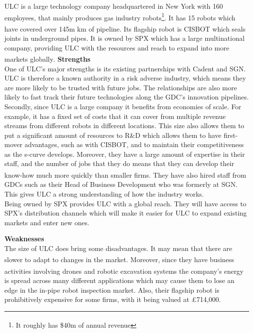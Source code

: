 \documentclass[11pt]{article}		%
\newcommand{\supercite}[1]{\textsuperscript{\cite{#1}}}		%
\begin{document}
     	ULC is a large technology company headquartered in New York with 160 employees, that mainly produces gas industry robots\footnote{It roughly has \$40m of annual revenue\supercite{SPX_acquisition}}. It has 15 robots which have covered over 145m km of pipeline\supercite{ULC_news}. Its flagship robot is CISBOT which seals joints in underground pipes. It is owned by SPX which has a large multinational company, providing ULC with the resources and reach to expand into more markets globally\supercite{SPX_acquisition}. %
     	    \pagebreak
	        \textbf{Strengths}
	        \\
	        One of ULC's major strengths is its existing partnerships with Cadent and SGN. ULC is therefore a known authority in a risk adverse industry, which means they are more likely to be trusted with future jobs. The relationships are also more likely to fast track their future technologies along the GDC's innovation pipelines. 
	        \\
            \hspace*{2ex}Secondly, since ULC is a large company it benefits from economies of scale. For example, it has a fixed set of costs that it can cover from multiple revenue streams from different robots in different locations. This size also allows them to put a significant amount of resources to R\&D which allows them to have first-mover advantages, such as with CISBOT, and to maintain their competitiveness as the s-curve develops. Moreover, they have a large amount of expertise in their staff, and the number of jobs that they do means that they can develop their know-how much more quickly than smaller firms\supercite{Barney}.
	        They have also hired staff from GDCs  such as their Head of Business Development who was formerly at SGN. This gives ULC a strong understanding of how the industry works.
	        \\
            \hspace*{2ex}Being owned by SPX provides ULC with a global reach. They will have access to SPX's distribution channels which will make it easier for ULC to expand existing markets and enter new ones.
	        
	        \textbf{Weaknesses}
	        \\
	        The size of ULC does bring some disadvantages. It may mean that there are slower to adapt to changes in the market\supercite{ULC_Slow}. Moreover, since they have business activities involving drones and robotic excavation systems\supercite{ULC_news} the company's energy is spread across many different applications which may cause them to lose an edge in the in-pipe robot inspection market. Also, their flagship robot is prohibitively expensive for some firms, with it being valued at £714,000.
	        
\end{document}
